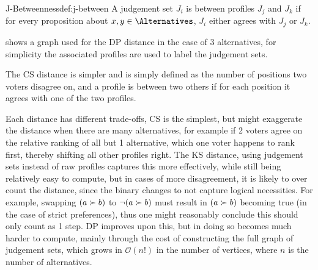 \begin{definition}{J-Betweenness}{def:j-between}
	A judgement set $J_i$ is between profiles $J_j$ and $J_k$ if for every proposition about $x,y \in \Alternatives$, $J_i$ either agrees with $J_j$ or $J_k$.
\end{definition}

 shows a graph used for the DP distance in the case of 3 alternatives, for simplicity the associated profiles are used to label the judgement sets.


The CS distance is simpler and is simply defined as the number of positions two voters disagree on, and a profile is between two others if for each position it agrees with one of the two profiles.

Each distance has different trade-offs, CS is the simplest, but might exaggerate the distance when there are many alternatives, for example if 2 voters agree on the relative ranking of all but 1 alternative, which one voter happens to rank first, thereby shifting all other profiles right. The KS distance, using judgement sets instead of raw profiles captures this more effectively, while still being relatively easy to compute, but in cases of more disagreement, it is likely to over count the distance, since the binary changes to not capture logical necessities. For example, swapping $( a \succ b)$ to $\neg (a \succ b)$ must result in $(a \succ b)$ becoming true (in the case of strict preferences), thus one might reasonably conclude this should only count as 1 step. DP improves upon this, but in doing so becomes much harder to compute, mainly through the cost of constructing the full graph of judgement sets, which grows in $\mathcal{O}(n!)$ in the number of vertices, where $n$ is the number of alternatives.


